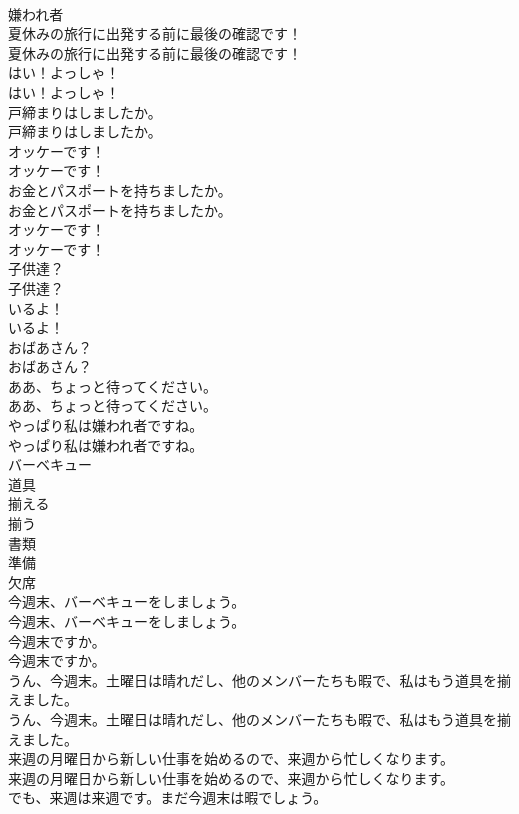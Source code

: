 \documentclass[8pt]{extreport}
\begin{document}
\begin{CJK}{UTF8}{min}
\\	嫌われ者
\\	夏休みの旅行に出発する前に最後の確認です！	
\\	夏休みの旅行に出発する前に最後の確認です！ 
\\	はい！よっしゃ！	
\\	はい！よっしゃ！ 
\\	戸締まりはしましたか。	
\\	戸締まりはしましたか。 
\\	オッケーです！	
\\	オッケーです！ 
\\	お金とパスポートを持ちましたか。	
\\	お金とパスポートを持ちましたか。 
\\	オッケーです！	
\\	オッケーです！ 
\\	子供達？	
\\	子供達？ 
\\	いるよ！	
\\	いるよ！ 
\\	おばあさん？	
\\	おばあさん？ 
\\	ああ、ちょっと待ってください。	
\\	ああ、ちょっと待ってください。 
\\	やっぱり私は嫌われ者ですね。	
\\	やっぱり私は嫌われ者ですね。 
\\	バーベキュー
\\	道具
\\	揃える
\\	揃う
\\	書類
\\	準備
\\	欠席
\\	今週末、バーベキューをしましょう。	
\\	今週末、バーベキューをしましょう。 
\\	今週末ですか。	
\\	今週末ですか。 
\\	うん、今週末。土曜日は晴れだし、他のメンバーたちも暇で、私はもう道具を揃えました。	
\\	うん、今週末。土曜日は晴れだし、他のメンバーたちも暇で、私はもう道具を揃えました。 
\\	来週の月曜日から新しい仕事を始めるので、来週から忙しくなります。	
\\	来週の月曜日から新しい仕事を始めるので、来週から忙しくなります。 
\\	でも、来週は来週です。まだ今週末は暇でしょう。	

\end{CJK}
\end{document}
